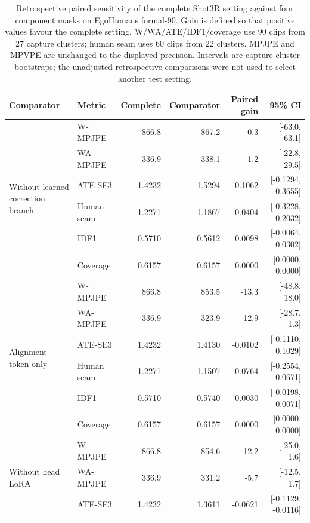 \begin{table}[t]
  \centering
  \scriptsize
  \setlength{\tabcolsep}{3.4pt}
  \caption{Retrospective paired sensitivity of the complete Shot3R setting
  against four component masks on EgoHumans formal-90. Gain is defined so that
  positive values favour the complete setting. W/WA/ATE/IDF1/coverage use 90
  clips from 27 capture clusters; human seam uses 60 clips from 22 clusters.
  MPJPE and MPVPE are unchanged to the displayed precision. Intervals are
  capture-cluster bootstraps; the unadjusted retrospective comparisons were
  not used to select another test setting.}
  \label{tab:egohumans-component-paired}
  \begin{tabular}{llrrrr}
    \toprule
    Comparator & Metric & Complete & Comparator & Paired gain & 95\% CI \\
    \midrule
    \multirow{6}{*}{Without learned correction branch}
      & W-MPJPE & 866.8 & 867.2 & 0.3 & [-63.0, 63.1] \\
      & WA-MPJPE & 336.9 & 338.1 & 1.2 & [-22.8, 29.5] \\
      & ATE-SE3 & 1.4232 & 1.5294 & 0.1062 & [-0.1294, 0.3655] \\
      & Human seam & 1.2271 & 1.1867 & -0.0404 & [-0.3228, 0.2032] \\
      & IDF1 & 0.5710 & 0.5612 & 0.0098 & [-0.0064, 0.0302] \\
      & Coverage & 0.6157 & 0.6157 & 0.0000 & [0.0000, 0.0000] \\
    \midrule
    \multirow{6}{*}{Alignment token only}
      & W-MPJPE & 866.8 & 853.5 & -13.3 & [-48.8, 18.0] \\
      & WA-MPJPE & 336.9 & 323.9 & -12.9 & [-28.7, -1.3] \\
      & ATE-SE3 & 1.4232 & 1.4130 & -0.0102 & [-0.1110, 0.1029] \\
      & Human seam & 1.2271 & 1.1507 & -0.0764 & [-0.2554, 0.0671] \\
      & IDF1 & 0.5710 & 0.5740 & -0.0030 & [-0.0198, 0.0071] \\
      & Coverage & 0.6157 & 0.6157 & 0.0000 & [0.0000, 0.0000] \\
    \midrule
    \multirow{6}{*}{Without head LoRA}
      & W-MPJPE & 866.8 & 854.6 & -12.2 & [-25.0, 1.6] \\
      & WA-MPJPE & 336.9 & 331.2 & -5.7 & [-12.5, 1.7] \\
      & ATE-SE3 & 1.4232 & 1.3611 & -0.0621 & [-0.1129, -0.0116] \\

\end{tabular}
\end{table}
